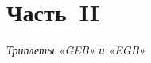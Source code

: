 \documentclass[a4paper,12pt,oneside,openany]{memoir}
\begin{document}
% 
% 
% 
% 
% 
% 
% 
% 

\part{Часть~II}

\emph{Триплеты «GEB» и «EGB»}

% 
% 
\end{document}

